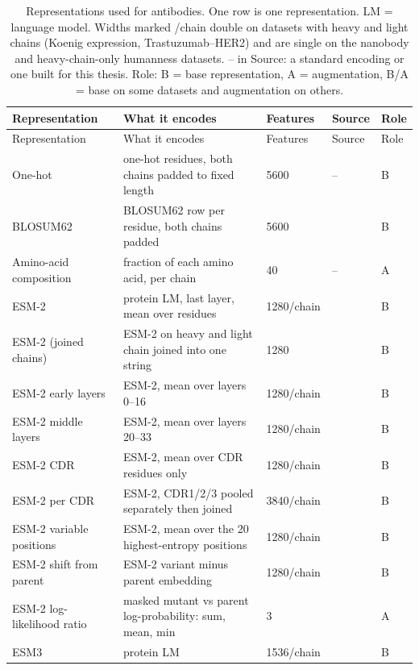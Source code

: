 \begin{longtable}{P{2.8cm}P{4.6cm}P{2.0cm}P{1.5cm}P{1.4cm}}
\caption[Representations used for antibodies.]{Representations used for antibodies. One row is one representation. LM = language model. Widths marked /chain double on datasets with heavy and light chains (Koenig expression, Trastuzumab--HER2) and are single on the nanobody and heavy-chain-only humanness datasets. -- in Source: a standard encoding or one built for this thesis. Role: B = base representation, A = augmentation, B/A = base on some datasets and augmentation on others.}\label{tab:reps_antibodies}\\
\toprule
Representation & What it encodes & Features & Source & Role \\
\midrule
\endfirsthead
\toprule
Representation & What it encodes & Features & Source & Role \\
\midrule
\endhead
\bottomrule
\endfoot
One-hot & one-hot residues, both chains padded to fixed length & 5600 & -- & B \\
BLOSUM62 & BLOSUM62 row per residue, both chains padded & 5600 & \citep{Henikoff1992} & B \\
Amino-acid composition & fraction of each amino acid, per chain & 40 & -- & A \\
ESM-2 & protein LM, last layer, mean over residues & 1280/chain & \citep{Lin2023} & B \\
ESM-2 (joined chains) & ESM-2 on heavy and light chain joined into one string & 1280 & \citep{Lin2023} & B \\
ESM-2 early layers & ESM-2, mean over layers 0--16 & 1280/chain & \citep{Lin2023} & B \\
ESM-2 middle layers & ESM-2, mean over layers 20--33 & 1280/chain & \citep{Lin2023} & B \\
ESM-2 CDR & ESM-2, mean over CDR residues only & 1280/chain & \citep{Lin2023} & B \\
ESM-2 per CDR & ESM-2, CDR1/2/3 pooled separately then joined & 3840/chain & \citep{Lin2023} & B \\
ESM-2 variable positions & ESM-2, mean over the 20 highest-entropy positions & 1280/chain & \citep{Lin2023} & B \\
ESM-2 shift from parent & ESM-2 variant minus parent embedding & 1280/chain & \citep{Lin2023} & B \\
ESM-2 log-likelihood ratio & masked mutant vs parent log-probability: sum, mean, min & 3 & \citep{Meier2021} & A \\
ESM3 & protein LM & 1536/chain & \citep{Hayes2025} & B \\

\end{longtable}
